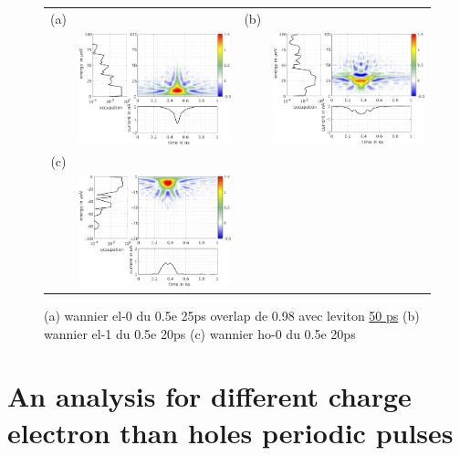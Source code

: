 \begin{figure}[hptb]
	\begin{center}
		\begin{tabular}{c c c c}
			
			(a) & & (b) &  \\ 
			& \includegraphics[width = 6.5 cm]{./appD/wannierwigData_leviton_20ps_0_5e_51mK_Projected_Gradient_Method-el-0} &
			& \includegraphics[width = 6.5 cm]{./appD/wannierwigData_leviton_20ps_0_5e_51mK_Projected_Gradient_Method-el-1} \\
			(c) & & & \\
			& \includegraphics[width = 6.5 cm]{./appD/wannierwigData_leviton_20ps_0_5e_51mK_Projected_Gradient_Method-ho-0} & &
		\end{tabular} 
	\end{center}
	\caption{(a) wannier el-0 du 0.5e 25ps overlap de 0.98 avec leviton \underline{50 ps} (b) wannier el-1 du 0.5e 20ps (c) wannier ho-0 du 0.5e 20ps}
	\label{fig: wannier du 0.5e 20ps}
\end{figure}

\section{An analysis for different charge electron than holes periodic pulses}


